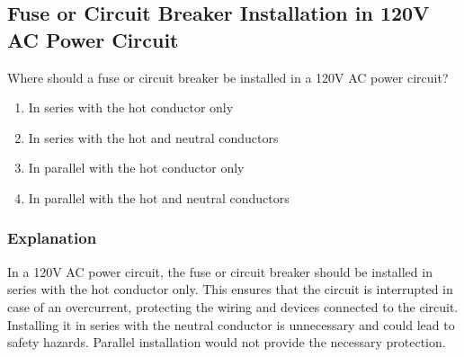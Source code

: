 \subsection{Fuse or Circuit Breaker Installation in 120V AC Power Circuit}
\label{T0A08}

\begin{tcolorbox}[colback=gray!10!white,colframe=black!75!black,title=T0A08]
Where should a fuse or circuit breaker be installed in a 120V AC power circuit?
\begin{enumerate}[noitemsep]
    \item In series with the hot conductor only
    \item In series with the hot and neutral conductors
    \item In parallel with the hot conductor only
    \item In parallel with the hot and neutral conductors
\end{enumerate}
\end{tcolorbox}

\subsubsection*{Explanation}
In a 120V AC power circuit, the fuse or circuit breaker should be installed in series with the hot conductor only. This ensures that the circuit is interrupted in case of an overcurrent, protecting the wiring and devices connected to the circuit. Installing it in series with the neutral conductor is unnecessary and could lead to safety hazards. Parallel installation would not provide the necessary protection.